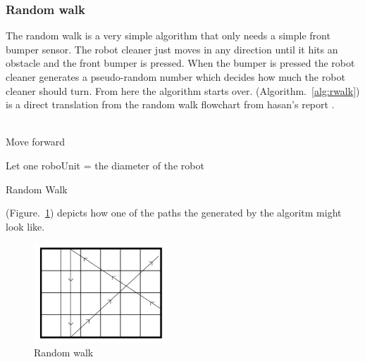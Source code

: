 \documentclass[bachelor]{kththesis}
\begin{document}
\subsubsection{Random walk}
The random walk is a very simple algorithm that only needs a simple front bumper sensor.  The robot cleaner just moves in any direction until it hits an obstacle and the front bumper is pressed. When the bumper is pressed the robot cleaner generates a pseudo-random number which decides how much the robot cleaner should turn. From here the algorithm starts over.
(Algorithm.~\ref{alg:rwalk}) is a direct translation from the random walk flowchart from hasan's report \parencite{hasan}.
\\\\
\begin{algorithm}[H]
	\SetAlgoLined
	Move forward
	
	Let one roboUnit = the diameter of the robot
	

	\caption{Random Walk}
	\label{alg:rwalk}
	
\end{algorithm}
\bigskip
\noindent  (Figure.~\ref{fig:rwalk}) depicts how one of the paths the generated by the algoritm might look like. 
\begin{figure}[H]
	\includegraphics[width=5cm]{img/rwalk.png}
	\centering
	\caption{Random walk}
	\label{fig:rwalk}
\end{figure}
\end{document}
